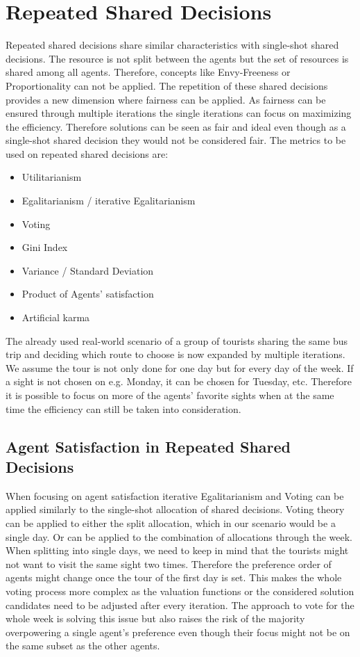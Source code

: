 \documentclass[german, a4paper, 11pt, oneside]{scrbook}
\begin{document}
\section{Repeated Shared Decisions}
Repeated shared decisions share similar characteristics with single-shot shared decisions. The resource is not split between the agents but the set of resources is shared among all agents. Therefore, concepts like Envy-Freeness or Proportionality can not be applied. The repetition of these shared decisions provides a new dimension where fairness can be applied. As fairness can be ensured through multiple iterations the single iterations can focus on maximizing the efficiency. Therefore solutions can be seen as fair and ideal even though as a single-shot shared decision they would not be considered fair. The metrics to be used on repeated shared decisions are: 
\begin{itemize}
  \item Utilitarianism
  \item Egalitarianism / iterative Egalitarianism
  \item Voting
\item Gini Index
\item Variance / Standard Deviation
\item Product of Agents' satisfaction
\item Artificial karma
\end{itemize}
The already used real-world scenario of a group of tourists sharing the same bus trip and deciding which route to choose is now expanded by multiple iterations. We assume the tour is not only done for one day but for every day of the week. If a sight is not chosen on e.g. Monday, it can be chosen for Tuesday, etc. Therefore it is possible to focus on more of the agents' favorite sights when at the same time the efficiency can still be taken into consideration.
\subsection{Agent Satisfaction in Repeated Shared Decisions}
When focusing on agent satisfaction iterative Egalitarianism and Voting can be applied similarly to the single-shot allocation of shared decisions. Voting theory can be applied to either the split allocation, which in our scenario would be a single day. Or can be applied to the combination of allocations through the week. When splitting into single days, we need to keep in mind that the tourists might not want to visit the same sight two times. Therefore the preference order of agents might change once the tour of the first day is set. This makes the whole voting process more complex as the valuation functions or the considered solution candidates need to be adjusted after every iteration. The approach to vote for the whole week is solving this issue but also raises the risk of the majority overpowering a single agent's preference even though their focus might not be on the same subset as the other agents.
\end{document}
